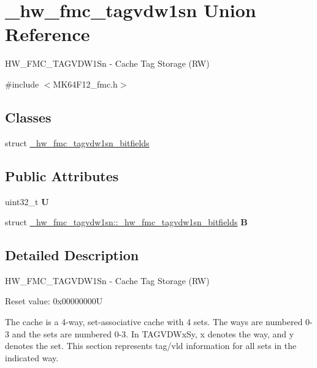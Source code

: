 \hypertarget{union__hw__fmc__tagvdw1sn}{}\section{\+\_\+hw\+\_\+fmc\+\_\+tagvdw1sn Union Reference}
\label{union__hw__fmc__tagvdw1sn}


H\+W\+\_\+\+F\+M\+C\+\_\+\+T\+A\+G\+V\+D\+W1\+Sn -\/ Cache Tag Storage (RW)  




{\ttfamily \#include $<$M\+K64\+F12\+\_\+fmc.\+h$>$}

\subsection*{Classes}
\begin{DoxyCompactItemize}
\item 
struct \hyperlink{struct__hw__fmc__tagvdw1sn_1_1__hw__fmc__tagvdw1sn__bitfields}{\+\_\+hw\+\_\+fmc\+\_\+tagvdw1sn\+\_\+bitfields}
\end{DoxyCompactItemize}
\subsection*{Public Attributes}
\begin{DoxyCompactItemize}
\item 
uint32\+\_\+t {\bfseries U}\hypertarget{union__hw__fmc__tagvdw1sn_a02af51f50d23fa3bbe4267b164c97c28}{}\label{union__hw__fmc__tagvdw1sn_a02af51f50d23fa3bbe4267b164c97c28}

\item 
struct \hyperlink{struct__hw__fmc__tagvdw1sn_1_1__hw__fmc__tagvdw1sn__bitfields}{\+\_\+hw\+\_\+fmc\+\_\+tagvdw1sn\+::\+\_\+hw\+\_\+fmc\+\_\+tagvdw1sn\+\_\+bitfields} {\bfseries B}\hypertarget{union__hw__fmc__tagvdw1sn_a24a73451e1e5faf56a7e98ccdb3118f6}{}\label{union__hw__fmc__tagvdw1sn_a24a73451e1e5faf56a7e98ccdb3118f6}

\end{DoxyCompactItemize}


\subsection{Detailed Description}
H\+W\+\_\+\+F\+M\+C\+\_\+\+T\+A\+G\+V\+D\+W1\+Sn -\/ Cache Tag Storage (RW) 

Reset value\+: 0x00000000U

The cache is a 4-\/way, set-\/associative cache with 4 sets. The ways are numbered 0-\/3 and the sets are numbered 0-\/3. In T\+A\+G\+V\+D\+Wx\+Sy, x denotes the way, and y denotes the set. This section represents tag/vld information for all sets in the indicated way. 

